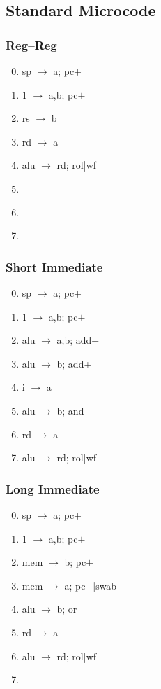 \documentclass[11pt]{book}
\begin{document}
\subsection*{Standard Microcode}
\begin{multicols}{3}\ttfamily\selectfont\small
  \subsubsection*{Reg--Reg}
  \begin{enumerate}\setcounter{enumi}{-1}
  \item sp \(\rightarrow\) a; pc\(+\)
  \item 1 \(\rightarrow\) a,b; pc\(+\)
  \item rs \(\rightarrow\) b
  \item rd \(\rightarrow\) a
  \item alu \(\rightarrow\) rd; rol|wf
  \item --
  \item --
  \item --
  \end{enumerate}
  \columnbreak
  \subsubsection*{Short Immediate}
  \begin{enumerate}\setcounter{enumi}{-1}
  \item sp \(\rightarrow\) a; pc\(+\)
  \item 1 \(\rightarrow\) a,b; pc\(+\)
  \item alu \(\rightarrow\) a,b; add+
  \item alu \(\rightarrow\) b; add+
  \item i \(\rightarrow\) a
  \item alu \(\rightarrow\) b; and
  \item rd \(\rightarrow\) a
  \item alu \(\rightarrow\) rd; rol|wf
  \end{enumerate}
  \columnbreak
  \subsubsection*{Long Immediate}
  \begin{enumerate}\setcounter{enumi}{-1}
  \item sp \(\rightarrow\) a; pc\(+\)
  \item 1 \(\rightarrow\) a,b; pc\(+\)
  \item mem \(\rightarrow\) b; pc\(+\)
  \item mem \(\rightarrow\) a; pc\(+\)|swab
  \item alu \(\rightarrow\) b; or
  \item rd \(\rightarrow\) a
  \item alu \(\rightarrow\) rd; rol|wf
  \item --
  \end{enumerate}
\end{multicols}
\end{document}
